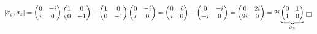\documentclass[solutions.tex]{subfiles}
\begin{document}
\[
	[\sigma_y, \sigma_z] = \begin{pmatrix}
		0 & -i \\
		i & 0 \\
	\end{pmatrix}\begin{pmatrix}
		1 & 0 \\
		0 & -1 \\
	\end{pmatrix} - \begin{pmatrix}
		1 & 0 \\
		0 & -1 \\
	\end{pmatrix}\begin{pmatrix}
		0 & -i \\
		i & 0 \\
	\end{pmatrix} = \begin{pmatrix}
		0 & i \\
		i & 0 \\
	\end{pmatrix} - \begin{pmatrix}
		0 & -i \\
		-i & 0 \\
	\end{pmatrix} = \begin{pmatrix}
		0 & 2i \\
		2i & 0 \\
	\end{pmatrix} = 2i\underbrace{\begin{pmatrix}
		0 & 1 \\
		1 & 0 \\
	\end{pmatrix}}_{\sigma_x} \qed
\]
\end{document}
